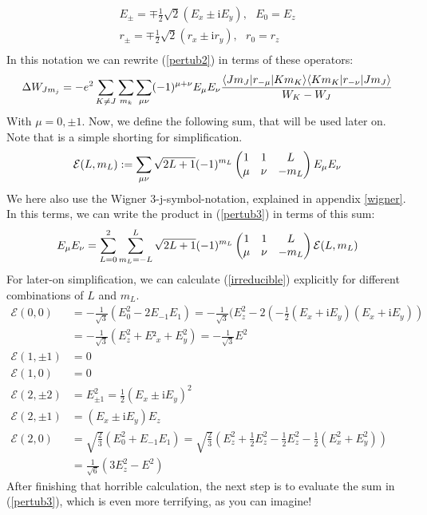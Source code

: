 \begin{align}
E_{\pm}=\mp\frac{1}{2}\sqrt{2}(E_x\pm \mathrm{i}E_y),\ \ \ E_0=E_z\\
r_{\pm}=\mp\frac{1}{2}\sqrt{2}(r_x\pm \mathrm{i}r_y),\ \ \ r_0=r_z\\
\end{align}
In this notation we can rewrite (\ref{pertub2}) in terms of these operators:
\begin{equation}
\Delta W_{Jm_j}=-e^2\sum_{K\neq J}\sum_{m_k}\sum_{\mu\nu}(-1)^{\mu+\nu}E_\mu E_\nu\frac{\langle Jm_J| r_{-\mu} | Km_K\rangle\langle Km_K| r_{-\nu} | Jm_J\rangle}{W_K-W_J}\label{pertub3}
\end{equation}
With $\mu=0,\pm1$. Now, we define the following sum, that will be used later on. Note that is a simple shorting for simplification.
\begin{equation}
\mathcal{E}(L,m_L):=\sum_{\mu\nu}\sqrt{2L+1}(-1)^{m_L}\begin{pmatrix}1&1&L\\\mu&\nu&-m_L\end{pmatrix}E_\mu E_\nu\label{irreducible}
\end{equation}
We here also use the Wigner 3-j-symbol-notation, explained in appendix \ref{wigner}. In this terms, we can write the product in (\ref{pertub3}) in terms of this sum: 
\begin{equation}
E_\mu E_\nu=\sum^2_{L=0}\sum^L_{m_L=-L}\sqrt{2L+1}(-1)^{m_L}\begin{pmatrix}1&1&L\\\mu&\nu&-m_L\end{pmatrix}\mathcal{E}(L,m_L)
\end{equation}
For later-on simplification, we can calculate (\ref{irreducible}) explicitly for different combinations of $L$ and $m_L$.
\begin{align*}
\mathcal{E}(0,0)&=-\frac{1}{\sqrt{3}}(E^2_0-2E_{-1}E_{1})=-\frac{1}{\sqrt{3}}(E^2_z-2(-\frac{1}{2}(E_x+\mathrm{i}E_y)(E_x+\mathrm{i}E_y))\\&=-\frac{1}{\sqrt{3}}(E^2_z+E²_x+E^2_y)=-\frac{1}{\sqrt{3}}E^2\\
\mathcal{E}(1,\pm 1)&=0\\
\mathcal{E}(1,0)&=0\\
\mathcal{E}(2,\pm2)&=E^2_{\pm1}=\frac{1}{2}(E_x\pm \mathrm{i}E_y)^2\\
\mathcal{E}(2,\pm1)&=(E_x\pm \mathrm{i}E_y)E_z\\
\mathcal{E}(2,0)&=\sqrt{\frac{2}{3}}(E^2_0+E_{-1}E_1)=\sqrt{\frac{2}{3}}(E^2_z+\frac{1}{2}E^2_z-\frac{1}{2}E^2_z-\frac{1}{2}(E^2_x+E^2_y))\\&=\frac{1}{\sqrt{6}}(3E^2_z-E^2)
\end{align*}
After finishing that horrible calculation, the next step is to evaluate the sum in (\ref{pertub3}), which is even more terrifying, as you can imagine!

